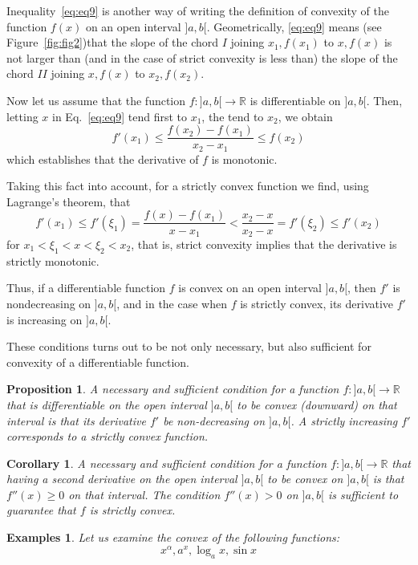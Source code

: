 \documentclass[a4paper,12pt]{article} %
\newtheorem{proposition}{Proposition}[section]
\newtheorem{corollary}[theorem]{Corollary}
\newtheorem{example}{Examples}
\begin{document}
Inequality~\ref{eq:eq9} is another way of writing the definition of 
convexity of the function $f(x)$ on an open interval $]a,b[$. Geometrically,
\ref{eq:eq9} means (see Figure~\ref{fig:fig2})that the slope of the chord $I$
joining $x_1, f(x_1)$ to $x, f(x)$ is not larger than (and in the case of strict
convexity is less than) the slope of the chord $II$ joining $x, f(x)$ to $x_2, f(x_2)$.

Now let us assume that the function $f: ]a,b[ \to \mathbb{R}$ is differentiable 
on $]a,b[$. Then, letting $x$ in Eq.~\ref{eq:eq9} tend first to $x_1$, the tend 
to $x_2$, we obtain 
\[
    f'(x_1) \le \frac{f(x_2) - f(x_1)}{x_2 - x_1} \le f(x_2)
    \]
which establishes that the derivative of $f$ is monotonic.

Taking this fact into account, for a strictly convex function we find, using 
Lagrange's theorem, that 
\[
    f'(x_1) \le f'(\xi_1) = \frac{f(x) - f(x_1)}{x - x_1} < \frac{x_2 - x}{x_2 - x} = f'(\xi_2)
    \le f'(x_2)
    \]
for $x_1 < \xi_1 < x < \xi_2 < x_2$, that is, strict convexity implies that the derivative 
is strictly monotonic.

Thus, if a differentiable function $f$ is convex on an open interval $]a,b[$,
then $f'$ is nondecreasing on $]a,b[$, and in the case when $f$ is strictly convex, 
its derivative $f'$ is increasing on $]a,b[$.

These conditions turns out to be not only necessary, but also sufficient 
for convexity of a differentiable function.

\begin{proposition}
    \normalfont
    A necessary and sufficient condition for a function $f: ]a,b[ \to \mathbb{R}$
    that is differentiable on the open interval $]a,b[$ to be convex (downward)
    on that interval is that its derivative $f'$ be non-decreasing on $]a,b[$. 
    A strictly increasing $f'$ corresponds to a strictly convex function.
\end{proposition}

\begin{corollary}
    \normalfont
    A necessary and sufficient condition for a function $f: ]a,b[ \to \mathbb{R}$
    that having a second derivative on the open interval $]a,b[$ to be convex 
    on $]a,b[$ is that $f''(x) \ge 0$ on that interval. The condition $f''(x) > 0$
    on $]a, b[$ is sufficient to guarantee that $f$ is strictly convex.
\end{corollary}

\begin{example}
    \normalfont
    Let us examine the convex of the following functions:
    \[
     x^{\alpha}, a^x, \log_ax, \sin x
     \]
\end{example}
\end{document}
